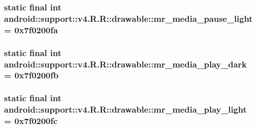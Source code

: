 \hypertarget{classandroid_1_1support_1_1v4_1_1_r_1_1drawable_98faee8c8ffa0c9c4a35d7438d35f82b}{
\subsubsection[{mr\_\-media\_\-pause\_\-light}]{\setlength{\rightskip}{0pt plus 5cm}static final int android::support::v4.R.R::drawable::mr\_\-media\_\-pause\_\-light = 0x7f0200fa}}
\label{classandroid_1_1support_1_1v4_1_1_r_1_1drawable_98faee8c8ffa0c9c4a35d7438d35f82b}


\hypertarget{classandroid_1_1support_1_1v4_1_1_r_1_1drawable_0a4af57b3fc1313c2a87f59d6e354103}{
\subsubsection[{mr\_\-media\_\-play\_\-dark}]{\setlength{\rightskip}{0pt plus 5cm}static final int android::support::v4.R.R::drawable::mr\_\-media\_\-play\_\-dark = 0x7f0200fb}}
\label{classandroid_1_1support_1_1v4_1_1_r_1_1drawable_0a4af57b3fc1313c2a87f59d6e354103}


\hypertarget{classandroid_1_1support_1_1v4_1_1_r_1_1drawable_f4e143793f79332c19afe8c6868199a8}{
\subsubsection[{mr\_\-media\_\-play\_\-light}]{\setlength{\rightskip}{0pt plus 5cm}static final int android::support::v4.R.R::drawable::mr\_\-media\_\-play\_\-light = 0x7f0200fc}}
\label{classandroid_1_1support_1_1v4_1_1_r_1_1drawable_f4e143793f79332c19afe8c6868199a8}


